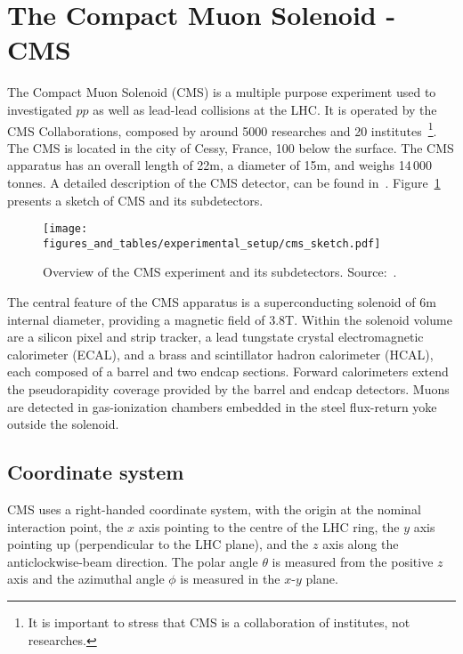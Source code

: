 
\section{The Compact Muon Solenoid - CMS}

The Compact Muon Solenoid (CMS) is a multiple purpose experiment used to investigated $pp$ as well as lead-lead collisions at the LHC. It is operated by the CMS Collaborations, composed by around 5000 researches and 20 institutes~\footnote{It is important to stress that CMS is a collaboration of institutes, not researches.}. The CMS is located in the city of Cessy, France, 100 below the surface. The CMS apparatus has an overall length of 22\unit{m}, a diameter of 15\unit{m}, and weighs 14\,000 \unit{tonnes}. A detailed description of the CMS detector, can be found in~\cite{Chatrchyan:2008zzk}. Figure~\ref{cms_sketch} presents a sketch of CMS and its subdetectors.

\begin{figure}[htbp]
    \centering
    \texttt{[image: figures\_and\_tables/experimental\_setup/cms\_sketch.pdf]}
    \caption{Overview of the CMS experiment and its subdetectors. Source:~\cite{Sakuma:2665537}.}
    \label{cms_sketch}
\end{figure}

The central feature of the CMS apparatus is a superconducting solenoid of 6\unit{m} internal diameter, providing a magnetic field of 3.8\unit{T}. Within the solenoid volume are a silicon pixel and strip tracker, a lead tungstate crystal electromagnetic calorimeter (ECAL), and a brass and scintillator hadron calorimeter (HCAL), each composed of a barrel and two endcap sections. Forward calorimeters extend the pseudorapidity coverage provided by the barrel and endcap detectors. Muons are detected in gas-ionization chambers embedded in the steel flux-return yoke outside the solenoid.  


\subsection{Coordinate system}

CMS uses a right-handed coordinate system, with the origin at the nominal interaction point, the $x$ axis pointing to the centre of the LHC ring, the $y$ axis pointing up (perpendicular to the LHC plane), and the $z$ axis along the anticlockwise-beam direction. The polar angle $\theta$ is measured from the positive $z$ axis and the azimuthal angle $\phi$ is measured in the $x$-$y$ plane.


